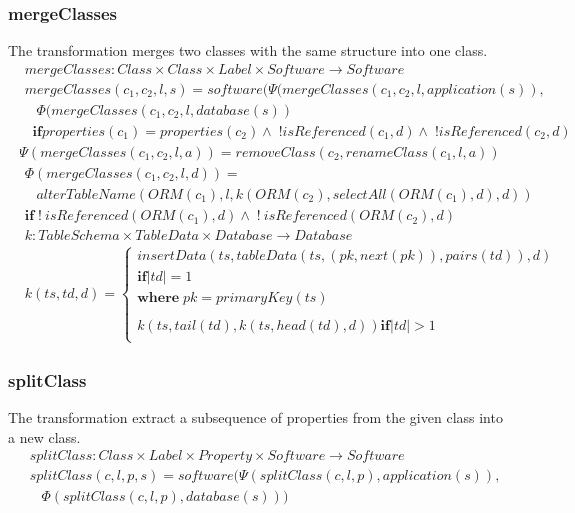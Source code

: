 \documentclass[10pt]{article}
\begin{document}
\subsubsection{mergeClasses}
The transformation merges two classes with the same structure into one class.
\begin{align}
& mergeClasses: Class \times Class \times Label \times Software  \rightarrow Software \\
& mergeClasses(c_1, c_2, l, s) = software(\Psi(mergeClasses(c_1, c_2, l, application(s)), \nonumber \\
& \;\;\; \Phi(mergeClasses(c_1, c_2, l, database(s)) \nonumber \\
& \;\; \mathbf{if} properties(c_1) = properties(c_2) \land \; !isReferenced(c_1, d) \land  \; !isReferenced(c_2, d)
\end{align}
\begin{align}
\Psi(mergeClasses(c_1, c_2, l, a)) = removeClass(c_2, renameClass(c_1, l, a))
\end{align}
\begin{align}
& \Phi(mergeClasses(c_1, c_2, l, d)) = \nonumber \\
& \;\;\; alterTableName(ORM(c_1), l, k(ORM(c_2), selectAll(ORM(c_1), d), d)) \nonumber \\
&  \mathbf{if} \; !\:isReferenced(ORM(c_1), d) \land \; !\:isReferenced(ORM(c_2), d) 
\end{align}
\begin{align}
& k: TableSchema \times TableData \times Database \rightarrow Database \\
& k(ts, td, d) = \begin{cases}
 insertData(ts, tableData(ts, (pk, next(pk)) , pairs(td)) , d) \\
 \mathbf{if} |td| = 1 \\
 \mathbf{where} \; pk = primaryKey(ts) 
 \\\\
 k(ts, tail(td), k(ts, head(td), d))
  \mathbf{if} |td| > 1 \\
 \end{cases}
\end{align}



\subsubsection{splitClass}
The transformation extract a subsequence of properties from the given class into a new class. 
\begin{align}
& splitClass: Class \times Label \times Property \times Software \rightarrow Software \\
& splitClass(c, l, p, s) = software(\Psi(splitClass(c, l, p), application(s)), \nonumber \\
& \;\;\; \Phi(splitClass(c, l, p), database(s)))
\end{align}
\end{document}
